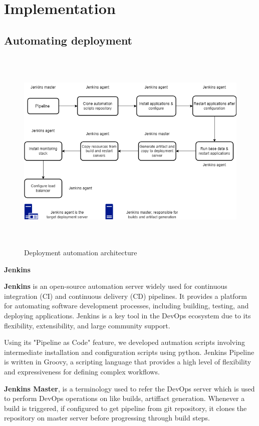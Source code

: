 \documentclass[12pt,a4paper,oneside]{report}
\begin{document}
\newpage
\chapter{Implementation}
\section{Automating deployment}
\begin{figure}[H]
	\centering
	\includegraphics[width=155mm , height = 100mm]{images/jenkins-full.png}
	\caption{Deployment automation architecture}
	\label{fig:figure4_1}
\end{figure}
\textbf{{\large Jenkins}}
\par\hspace{1cm} \textbf{Jenkins} is an open-source automation server widely used for continuous integration (CI) and continuous delivery (CD) pipelines. It provides a platform for automating software development processes, including building, testing, and deploying applications. Jenkins is a key tool in the DevOps ecosystem due to its flexibility, extensibility, and large community support. 
\par\hspace{1cm} Using its "Pipeline as Code" feature, we developed autmation scripts involving intermediate installation and configuration scripts using python. Jenkins Pipeline is written in Groovy, a scripting language that provides a high level of flexibility and expressiveness for defining complex workflows.

\par\hspace{1cm} \textbf{Jenkins Master}, is a terminology used to refer the DevOps server which is used to perform DevOps operations on like builds, artiffact generation. Whenever a build is triggered, if configured to get pipeline from git repository, it clones the repository on master server before progressing through build steps.
\end{document}
